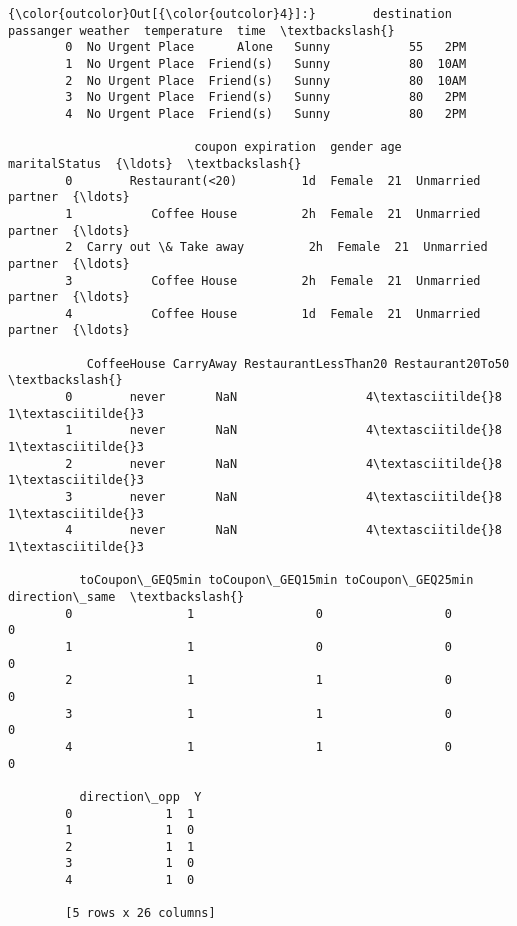 \documentclass[11pt]{article}
\begin{document}
\begin{Verbatim}[commandchars=\\\{\}]
{\color{outcolor}Out[{\color{outcolor}4}]:}        destination  passanger weather  temperature  time  \textbackslash{}
        0  No Urgent Place      Alone   Sunny           55   2PM   
        1  No Urgent Place  Friend(s)   Sunny           80  10AM   
        2  No Urgent Place  Friend(s)   Sunny           80  10AM   
        3  No Urgent Place  Friend(s)   Sunny           80   2PM   
        4  No Urgent Place  Friend(s)   Sunny           80   2PM   
        
                          coupon expiration  gender age      maritalStatus  {\ldots}  \textbackslash{}
        0        Restaurant(<20)         1d  Female  21  Unmarried partner  {\ldots}   
        1           Coffee House         2h  Female  21  Unmarried partner  {\ldots}   
        2  Carry out \& Take away         2h  Female  21  Unmarried partner  {\ldots}   
        3           Coffee House         2h  Female  21  Unmarried partner  {\ldots}   
        4           Coffee House         1d  Female  21  Unmarried partner  {\ldots}   
        
           CoffeeHouse CarryAway RestaurantLessThan20 Restaurant20To50  \textbackslash{}
        0        never       NaN                  4\textasciitilde{}8              1\textasciitilde{}3   
        1        never       NaN                  4\textasciitilde{}8              1\textasciitilde{}3   
        2        never       NaN                  4\textasciitilde{}8              1\textasciitilde{}3   
        3        never       NaN                  4\textasciitilde{}8              1\textasciitilde{}3   
        4        never       NaN                  4\textasciitilde{}8              1\textasciitilde{}3   
        
          toCoupon\_GEQ5min toCoupon\_GEQ15min toCoupon\_GEQ25min direction\_same  \textbackslash{}
        0                1                 0                 0              0   
        1                1                 0                 0              0   
        2                1                 1                 0              0   
        3                1                 1                 0              0   
        4                1                 1                 0              0   
        
          direction\_opp  Y  
        0             1  1  
        1             1  0  
        2             1  1  
        3             1  0  
        4             1  0  
        
        [5 rows x 26 columns]
\end{Verbatim}
            
\end{document}
